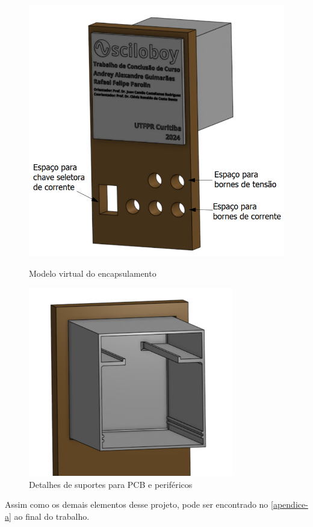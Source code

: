 \begin{figure}[htb!]
    \caption{Modelo virtual do encapsulamento}
    \vspace*{5mm}
    \includegraphics[width=1.0\textwidth]{figuras/osciloboy-case-1.png}
    \label{fig:osciloboy-isometrico}
    \fonte{}
\end{figure}

\begin{figure}[htb!]
    \caption{Detalhes de suportes para PCB e periféricos}
    \vspace*{5mm}
    \label{fig:osciloboy-detalhes}
    \includegraphics[width=0.8\textwidth]{figuras/osciloboy-case-2.png}
    \fonte{}
\end{figure}

Assim como os demais elementos desse projeto, pode ser encontrado no \autoref{apendice-a} ao final do trabalho.

